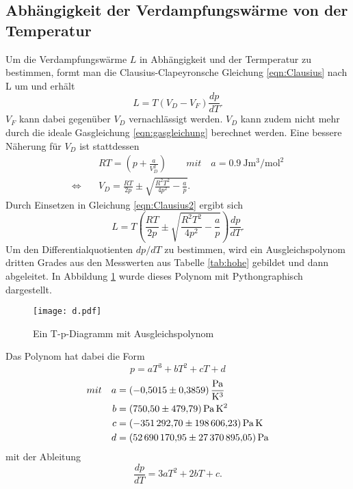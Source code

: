 \subsection{Abhängigkeit der Verdampfungswärme von der Temperatur}
Um die Verdampfungswärme $L$ in Abhängigkeit und der Termperatur zu bestimmen, formt man die
Clausius-Clapeyronsche Gleichung \eqref{eqn:Clausius} nach L um und erhält
\begin{equation}
  L=T(V_D-V_F)\frac{dp}{dT}. \label{eqn:Clausius2}
\end{equation}
$V_F$ kann dabei gegenüber $V_D$ vernachlässigt werden. $V_D$ kann zudem nicht mehr durch die
ideale Gasgleichung \eqref{eqn:gasgleichung} berechnet werden. Eine bessere Näherung für $V_D$
ist stattdessen 
\begin{align}
  &RT=\left(p+\frac{a}{V_D^2}\right) \qquad mit \quad a=\SI{0.9}{\joule\cubic\metre\per\square\mole}\\
  \Leftrightarrow \quad &V_D=\frac{RT}{2p}\pm\sqrt{\frac{R^2T^2}{4p^2}-\frac{a}{p}}. \label{eqn:V_d}
\end{align}
Durch Einsetzen in Gleichung \eqref{eqn:Clausius2} ergibt sich
\begin{equation}
  L=T\left(\frac{RT}{2p}\pm\sqrt{\frac{R^2T^2}{4p^2}-\frac{a}{p}}\right)\frac{dp}{dT}. \label{eqn:Clausius3}
\end{equation}
Um den Differentialquotienten $dp/dT$ zu bestimmen, wird ein Ausgleichspolynom dritten Grades
aus den Messwerten aus Tabelle \ref{tab:hohe} gebildet und dann abgeleitet. In Abbildung
\ref{fig:Polynom} wurde dieses Polynom mit Pythongraphisch dargestellt.
\begin{figure}
  \centering
  \texttt{[image: d.pdf]}
  \caption{Ein T-p-Diagramm mit Ausgleichspolynom}
  \label{fig:Polynom}
\end{figure}
Das Polynom hat dabei die Form
\begin{equation}
  p=aT^3+bT^2+cT+d
\end{equation}
\begin{align}
  mit \quad a &= \SI{-0.5015\pm0.3859}{\pascal\per\cubic\kelvin}\\
      b &= \SI{750.50\pm479.79}{\pascal\square\kelvin}\\
      c &= \SI{-351292.70\pm198606.23}{\pascal\kelvin}\\
      d &= \SI{52690170.95\pm27370895.05}{\pascal}
\end{align}
mit der Ableitung
\begin{equation}
  \frac{dp}{dT}=3aT^2+2bT+c.
\end{equation}
